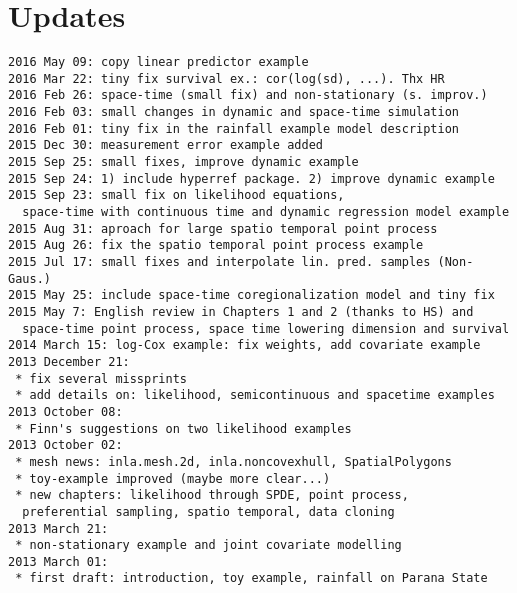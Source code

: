 \section{Updates}
\begin{verbatim}
2016 May 09: copy linear predictor example
2016 Mar 22: tiny fix survival ex.: cor(log(sd), ...). Thx HR
2016 Feb 26: space-time (small fix) and non-stationary (s. improv.)
2016 Feb 03: small changes in dynamic and space-time simulation
2016 Feb 01: tiny fix in the rainfall example model description
2015 Dec 30: measurement error example added 
2015 Sep 25: small fixes, improve dynamic example
2015 Sep 24: 1) include hyperref package. 2) improve dynamic example
2015 Sep 23: small fix on likelihood equations, 
  space-time with continuous time and dynamic regression model example
2015 Aug 31: aproach for large spatio temporal point process 
2015 Aug 26: fix the spatio temporal point process example  
2015 Jul 17: small fixes and interpolate lin. pred. samples (Non-Gaus.)
2015 May 25: include space-time coregionalization model and tiny fix
2015 May 7: English review in Chapters 1 and 2 (thanks to HS) and 
  space-time point process, space time lowering dimension and survival
2014 March 15: log-Cox example: fix weights, add covariate example
2013 December 21: 
 * fix several missprints
 * add details on: likelihood, semicontinuous and spacetime examples 
2013 October 08: 
 * Finn's suggestions on two likelihood examples 
2013 October 02:
 * mesh news: inla.mesh.2d, inla.noncovexhull, SpatialPolygons 
 * toy-example improved (maybe more clear...) 
 * new chapters: likelihood through SPDE, point process, 
  preferential sampling, spatio temporal, data cloning
2013 March 21:
 * non-stationary example and joint covariate modelling
2013 March 01: 
 * first draft: introduction, toy example, rainfall on Parana State
\end{verbatim}
